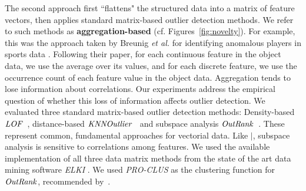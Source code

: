 \documentclass[conference]{IEEEtran}
\begin{document}
						
						The second approach first ``flattens" the structured data into a matrix of feature vectors, then applies standard matrix-based outlier detection methods. We refer to such methods as \textbf{aggregation-based}
						(cf. Figures~\ref{fig:novelty}). For example, this was the approach taken by Breunig {\em et al.} for identifying anomalous players in sports data \cite{Breunig2000}. Following their paper, for each continuous feature in the object data, we use the average over its values, and for each discrete feature, we use the occurrence count of each feature value in the object data. Aggregation 
						tends to lose information about correlations.
Our experiments address the empirical question of whether this loss of information affects outlier detection. 
						We evaluated three standard matrix-based outlier detection methods: Density-based $\it{LOF}$~\cite{Breunig2000}, distance-based $\it{KNNOutlier}$~\cite{Ramaswamy2000} and subspace analysis $\it{OutRank}$~\cite{Muller2012}.
						These represent common, fundamental  approaches for vectorial data. 
						Like $\mid$, subspace analysis is sensitive to correlations among features. 
						We used the available implementation of all three data matrix methods from the state of the art data mining software \textit{ELKI} \cite{Elke2013}. We used \textit{PRO-CLUS} as the clustering function for $\it{OutRank}$, recommended by~\cite{Muller2012}.


						
\end{document}

